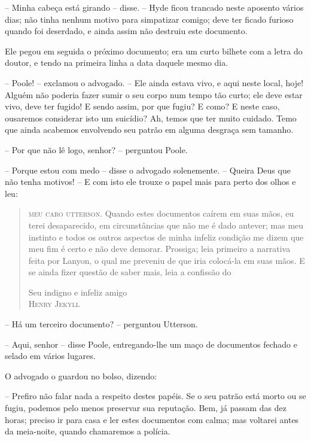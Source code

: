 -- Minha cabeça está girando -- disse. -- Hyde ficou trancado neste
aposento vários dias; não tinha nenhum motivo para simpatizar comigo;
deve ter ficado furioso quando foi deserdado, e ainda assim não
destruiu este documento. 

Ele pegou em seguida o próximo documento; era um curto bilhete com a
letra do doutor, e tendo na primeira linha a data daquele mesmo dia.

-- Poole! -- exclamou o advogado. -- Ele ainda estava vivo, e aqui neste
local, hoje!  Alguém não poderia fazer sumir o seu corpo num tempo tão
curto; ele deve estar vivo, deve ter fugido!  E sendo assim, por que
fugiu?  E como?  E neste caso, ousaremos considerar isto um suicídio? 
Ah, temos que ter muito cuidado.  Temo que ainda acabemos envolvendo
seu patrão em alguma desgraça sem tamanho.

-- Por que não lê logo, senhor? -- perguntou Poole.

-- Porque estou com medo -- disse o advogado solenemente. -- Queira Deus
que não tenha motivos!  -- E com isto ele trouxe o papel mais para
perto dos olhos e leu:

\begin{quote}
\textsc{meu caro utterson}. Quando estes documentos caírem em suas mãos, eu terei
desaparecido, em circunstâncias que não me é dado antever; mas meu
instinto e todos os outros aspectos de minha infeliz condição me dizem
que meu fim é certo e não deve demorar.  Prossiga; leia primeiro a
narrativa feita por Lanyon, o qual me preveniu de que iria colocá-la em
suas mãos.  E se ainda fizer questão de saber mais, leia a confissão do

{\raggedleft Seu indigno e infeliz amigo\\
\textsc{Henry Jekyll} \par}
\end{quote}

-- Há um terceiro documento? -- perguntou Utterson. 

-- Aqui, senhor -- disse Poole, entregando-lhe um maço de documentos
fechado e selado em vários lugares.

O advogado o guardou no bolso, dizendo:

-- Prefiro não falar nada a respeito destes papéis.  Se o seu patrão
está morto ou se fugiu, podemos pelo menos preservar sua reputação. 
Bem, já passam das dez horas; preciso ir para casa e ler estes
documentos com calma; mas voltarei antes da meia-noite, quando
chamaremos a polícia.

